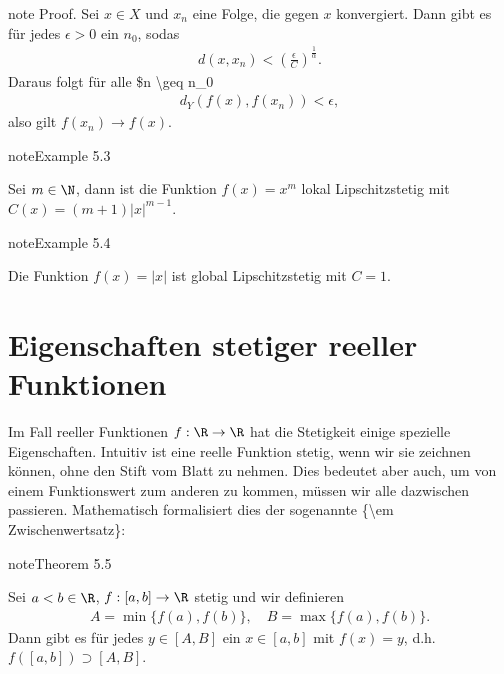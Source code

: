 \documentclass[letterpaper,10pt,english]{jupyterBook}
\begin{document}
\begin{sphinxadmonition}{note}
Proof.  Sei \(x \in X\) und \(x_n\) eine Folge, die gegen \(x\) konvergiert. Dann gibt es für jedes \(\epsilon > 0\) ein \(n_0\), sodas
\begin{equation*}
\begin{split} d(x,x_n) < \left( \frac{\epsilon}{C} \right)^{\frac{1}\alpha} .\end{split}
\end{equation*}
Daraus folgt für alle \$n \textbackslash{}geq n\_0
\begin{equation*}
\begin{split} d_Y(f(x),f(x_n)) < \epsilon ,\end{split}
\end{equation*}
also gilt \(f(x_n) \rightarrow f(x). \)
\end{sphinxadmonition}
\label{stetigkeit/stetigkeit:example-9}
\begin{sphinxadmonition}{note}{Example 5.3}



Sei \(m \in \N\), dann ist die Funktion \(f(x)=x^m\) lokal Lipschitz\sphinxhyphen{}stetig mit \(C(x) = ( m+1) |x|^{m-1}\).
\end{sphinxadmonition}
\label{stetigkeit/stetigkeit:example-10}
\begin{sphinxadmonition}{note}{Example 5.4}



Die Funktion \(f(x)=|x|\) ist global Lipschitz\sphinxhyphen{}stetig mit \(C=1\).
\end{sphinxadmonition}


\section{Eigenschaften stetiger reeller Funktionen}
\label{\detokenize{stetigkeit/eigenschaften:eigenschaften-stetiger-reeller-funktionen}}\label{\detokenize{stetigkeit/eigenschaften::doc}}
Im Fall reeller Funktionen \(f: \R \rightarrow \R\) hat die Stetigkeit einige spezielle Eigenschaften. Intuitiv ist eine reelle Funktion stetig, wenn wir sie zeichnen können, ohne den Stift vom Blatt zu nehmen. Dies bedeutet aber auch, um von einem Funktionswert zum anderen zu kommen, müssen wir alle dazwischen passieren. Mathematisch formalisiert dies der sogenannte \{\textbackslash{}em Zwischenwertsatz\}:
\label{stetigkeit/eigenschaften:theorem-0}
\begin{sphinxadmonition}{note}{Theorem 5.5}



Sei  \(a<b \in \R\), \(f: [a,b] \rightarrow \R\) stetig und wir definieren
\begin{equation*}
\begin{split} A = \min\{f(a),f(b)\}, \quad B = \max\{f(a),f(b)\}.\end{split}
\end{equation*}
Dann gibt es für jedes \(y \in [A,B]\) ein \(x \in [a,b]\) mit \(f(x) =y\), d.h. \(f([a,b]) \supset [A,B]\).
\end{sphinxadmonition}
\end{document}
